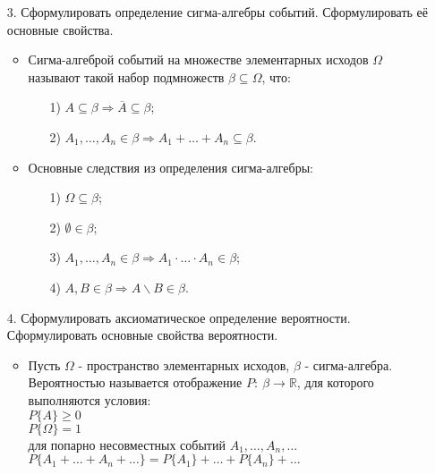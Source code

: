 \documentclass[a4paper]{article}
\begin{document}
\begin{enumerate}
\item[3.] Сформулировать определение сигма-алгебры событий. Сформулировать её основные свойства. \\
\begin{itemize}
\item Сигма-алгеброй событий на множестве элементарных исходов $\Omega$ называют такой набор подмножеств $\beta \subseteq \Omega$, что:
	\begin{enumerate}
	\item[1)] $A \subseteq \beta \Rightarrow \overline{A} \subseteq \beta$; \\
	\item[2)] $A_1, \ldots, A_n \in \beta \Rightarrow A_1 + \ldots + A_n \subseteq \beta$. \\
	\end{enumerate}
	
\item Основные следствия из определения сигма-алгебры:
	\begin{enumerate}
	\item[1)] $\Omega \subseteq \beta$; 
	\item[2)] $\emptyset \in \beta$; 
	\item[3)] $A_1, \ldots, A_n \in \beta \Rightarrow A_1 \cdot \ldots \cdot A_n \in \beta$; 
	\item[4)] $A,B \in \beta \Rightarrow A \backslash B \in \beta$. 
	\end{enumerate}
\end{itemize}



\item[4.] Сформулировать аксиоматическое определение вероятности. Сформулировать основные свойства вероятности. \\
\begin{itemize}
\item Пусть $\Omega$ - пространство элементарных исходов, $\beta$ - сигма-алгебра. Вероятностью называется отображение $P: \ \beta \to \mathbb{R}$, для которого выполняются условия: \\
$P\{A\} \geqslant 0$ \\
$P\{\Omega\} = 1$ \\
для попарно несовместных событий $A_1, \ldots, A_n, \ldots$ $P\{A_1 + \ldots + A_n + \ldots \} = P\{A_1\} + \ldots + P\{A_n\} + \ldots$


\end{itemize}
\end{enumerate}
\end{document}
